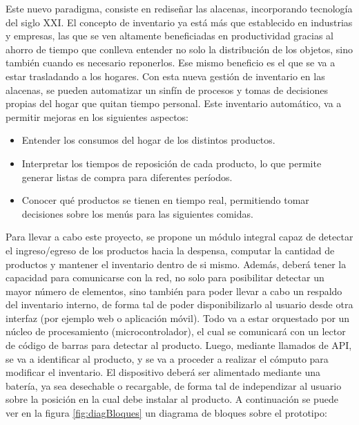\documentclass[
11pt, %
codirector, %
]{charter}
\begin{document}
Este nuevo paradigma, consiste en rediseñar las alacenas, incorporando tecnología del siglo XXI. El concepto de inventario ya está más que establecido en  industrias y empresas, las que se ven altamente beneficiadas en productividad gracias al ahorro de tiempo que  conlleva entender no solo la distribución de los objetos, sino también cuando es necesario reponerlos. Ese mismo beneficio es el que se va a estar trasladando a los hogares. Con esta nueva gestión de inventario en las alacenas, se pueden automatizar un sinfín de procesos y tomas de decisiones propias del hogar que quitan tiempo personal. Este inventario automático, va a permitir mejoras en los siguientes aspectos:

\begin{itemize}
    \item Entender los consumos del hogar de los distintos productos.
    \item Interpretar los tiempos de reposición de cada producto, lo que permite generar listas de compra para diferentes períodos.
    \item Conocer qué productos se tienen en tiempo real, permitiendo tomar decisiones sobre los menús para las siguientes comidas.
\end{itemize}

Para llevar a cabo este proyecto, se propone un módulo integral capaz de detectar el ingreso/egreso de los productos hacia la despensa, computar la cantidad de productos y mantener el inventario dentro de si mismo. Además, deberá tener la capacidad para comunicarse con la red, no solo para posibilitar detectar un mayor número de elementos, sino también para poder llevar a cabo un respaldo del inventario interno, de forma tal de poder disponibilizarlo al usuario desde otra interfaz (por ejemplo web o aplicación móvil). 
Todo va a estar orquestado por un núcleo de procesamiento (microcontrolador), el cual se comunicará con un lector de código de barras para detectar al producto. Luego, mediante llamados de API, se va a identificar al producto, y se va a proceder a realizar el cómputo para modificar el inventario.
El dispositivo deberá ser alimentado mediante una batería, ya sea desechable o recargable, de forma tal de independizar al usuario sobre la posición en la cual debe instalar al producto.
A continuación se puede ver en la figura \ref{fig:diagBloques} un diagrama de bloques sobre el prototipo:
\end{document}
